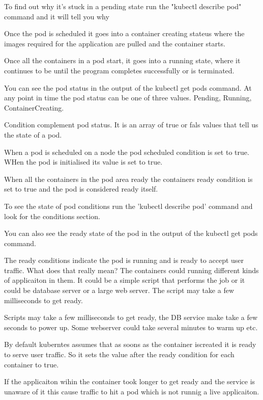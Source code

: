 \documentclass[11pt]{book}
\begin{document}
    To find out why it's stuck in a pending state run the "kubectl describe pod" command and it will tell you why

    Once the pod is scheduled it goes into a container creating stateus where the images required for the application are pulled and the container starts.

    Once all the containers in a pod start, it goes into a running state, where it continues to be until the program completes successfully or is terminated.

    You can see the pod status in the output of the kubectl get pods command.
    At any point in time the pod status can be one of three values. Pending, Running, ContainerCreating.

    Condition complement pod status.
    It is an array of true or fals values that tell us the state of a pod.

    When a pod is scheduled on a node the pod scheduled condition is set to true.
    WHen the pod is initialised its value is set to true.

    When all the containers in the pod area ready the containers ready condition is set to true and the pod is considered ready itself.


    To see the state of pod conditions run the 'kubectl describe pod' command and look for the conditions section.

    You can also see the ready state of the pod in the output of the kubectl get pods command.

    The ready conditions indicate the pod is running and is ready to accept user traffic.
    What does that really mean?
    The containers could running different kinds of applicaiton in them.
    It could be a simple script that performs the job or it could be database server or a large web server.
    The script may take a few milliseconds to get ready.

    Scripts may take a few milliseconds to get ready, the DB service make take a few seconds to power up.
    Some webserver could take several minutes to warm up etc.

    By default kuberntes assumes that as soons as the container iscreated it is ready to serve user traffic.
    So it sets the value after the ready condition for each container to true.

    If the applicaiton wihin the container took longer to get ready and the service is unaware of it this cause traffic to hit a pod which is not runnig a live applicaiton.
\end{document}
